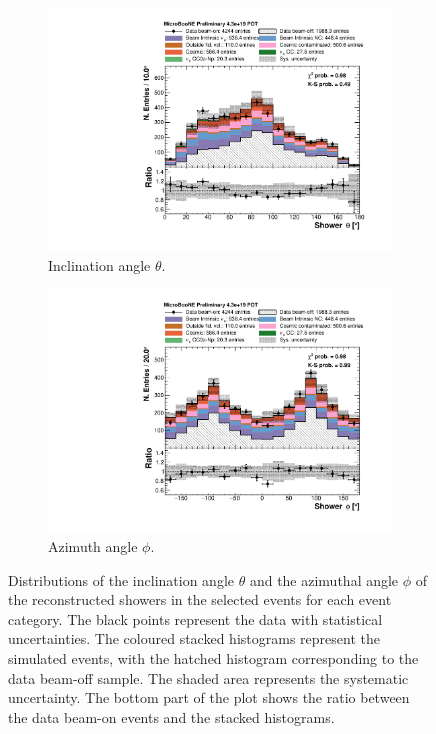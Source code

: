 \begin{figure}[htbp]
\centering
  \begin{subfigure}{0.49\textwidth}
    \includegraphics[width=\linewidth]{figures/h_shower_theta.pdf}
    \caption{Inclination angle $\theta$.} 
  \end{subfigure}\hfill
    \begin{subfigure}{0.49\textwidth}
    \includegraphics[width=\linewidth]{figures/h_shower_phi.pdf}
    \caption{Azimuth angle $\phi$.} 
  \end{subfigure}
  \caption{Distributions of the inclination angle $\theta$ and the azimuthal angle $\phi$ of the reconstructed showers in the selected events for each event category. The black points represent the data with statistical uncertainties. The coloured stacked histograms represent the simulated events, with the hatched histogram corresponding to the data beam-off sample. The shaded area represents the systematic uncertainty. The bottom part of the plot shows the ratio between the data beam-on events and the stacked histograms.}\label{fig:thetaphi}
\end{figure}

